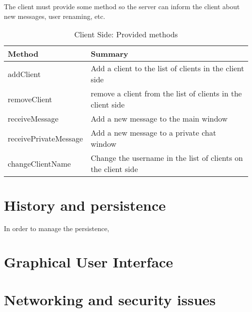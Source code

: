 \documentclass[8pt,a4paper]{article}
\begin{document}
The client must provide some method so the server can inform the client about new messages, user renaming, etc.  
  \begin{table}[H]
  \begin{center}
      \begin{tabular}{ | l | p{5cm} |}
      \hline
      Method & Summary \\ \hline
      addClient & Add a client to the list of clients in the client side \\ \hline 
      removeClient & remove a client from the list of clients in the client side \\ \hline
      receiveMessage & Add a new message to the main window \\ \hline
      receivePrivateMessage &  Add a new message to a private chat window \\ \hline
      changeClientName & Change the username in the list of clients on the client side \\ \hline
      \end{tabular}
  \end{center}
  \caption{Client Side: Provided methods}
  \label{tab:clientprovide}
  \end{table}

\section{History and persistence}

In order to manage the persistence, 

\section{Graphical User Interface}
\section{Networking and security issues}
\end{document}
